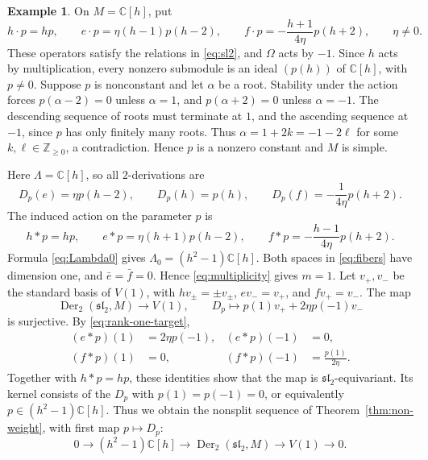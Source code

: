 \documentclass[11pt,reqno]{amsart}
\numberwithin{equation}{section}
\newcommand{\C}{\mathbb C}
\newcommand{\Z}{\mathbb Z}
\newcommand{\s}{\mathfrak{sl}_2}
\DeclareMathOperator{\Der}{Der}
\theoremstyle{definition}
\newtheorem{example}[theorem]{Example}
\theoremstyle{remark}
\begin{document}
\begin{example}\label{ex:nonsimple}
On \(M=\C[h]\), put
\begin{equation}\label{eq:rank-one-source}
h\cdot p=hp,\qquad e\cdot p=\eta(h-1)p(h-2),\qquad
f\cdot p=-\frac{h+1}{4\eta}p(h+2),\qquad \eta\ne0.
\end{equation}
These operators satisfy the relations in \eqref{eq:sl2}, and
\(\Omega\) acts by \(-1\).
Since \(h\) acts by multiplication, every nonzero submodule is
an ideal \((p(h))\) of \(\C[h]\), with \(p\ne0\).
Suppose \(p\) is nonconstant and let \(\alpha\) be a root.
Stability under the action forces \(p(\alpha-2)=0\) unless \(\alpha=1\),
and \(p(\alpha+2)=0\) unless \(\alpha=-1\).
The descending sequence of roots must terminate at \(1\),
and the ascending sequence at \(-1\), since \(p\) has only
finitely many roots. Thus
\(\alpha=1+2k=-1-2\ell\) for some \(k,\ell\in\Z_{\ge0}\),
a contradiction.
Hence \(p\) is a nonzero constant and \(M\) is simple.

Here \(\Lambda=\C[h]\), so all \(2\)-derivations are
\[
D_p(e)=\eta p(h-2),\qquad D_p(h)=p(h),\qquad
D_p(f)=-\frac{1}{4\eta}p(h+2).
\]
The induced action on the parameter \(p\) is
\begin{equation}\label{eq:rank-one-target}
h*p=hp,\qquad e*p=\eta(h+1)p(h-2),\qquad
f*p=-\frac{h-1}{4\eta}p(h+2).
\end{equation}
Formula \eqref{eq:Lambda0} gives
\(\Lambda_0=(h^2-1)\C[h]\). Both spaces in \eqref{eq:fibers} have dimension one, and
\(\bar e=\bar f=0\). Hence \eqref{eq:multiplicity} gives \(m=1\).
Let \(v_+,v_-\) be the standard basis of \(V(1)\), with
\(hv_\pm=\pm v_\pm\), \(ev_-=v_+\), and \(fv_+=v_-\).
The map
\[
\Der_2(\s,M)\longrightarrow V(1),\qquad
D_p\longmapsto p(1)v_++2\eta p(-1)v_-
\]
is surjective. By \eqref{eq:rank-one-target},
\[
\begin{aligned}
(e*p)(1)&=2\eta p(-1),& (e*p)(-1)&=0,\\
(f*p)(1)&=0,& (f*p)(-1)&=\frac{p(1)}{2\eta}.
\end{aligned}
\]
Together with \(h*p=hp\), these identities show that the map is
\(\s\)-equivariant. Its kernel consists of the \(D_p\) with
\(p(1)=p(-1)=0\), or equivalently \(p\in(h^2-1)\C[h]\).
Thus we obtain the nonsplit sequence of Theorem~\ref{thm:non-weight},
with first map \(p\mapsto D_p\):
\[
0\longrightarrow(h^2-1)\C[h]\longrightarrow
\Der_2(\s,M)\longrightarrow V(1)\longrightarrow0.
\]
\end{example}
\end{document}
